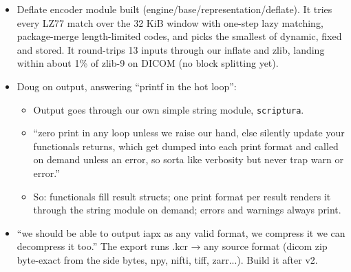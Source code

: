 \begin{itemize}
\begin{itemize}
\begin{enumerate}
\item the head (13 words) with its CRC-64;
\item the offsets and limbs with their CRC-64;
\item the deflated side bytes with a CRC-64 of the inflated bytes;
\item the member tables and names with their CRC-64;
\item EOF.
\end{enumerate}
\item engine\_\allowbreak{}iapx\_\allowbreak{}load takes an optional EngineSideBytes *side (the headers are handed back, and lane\_\allowbreak{}offset rides in it); engine\_\allowbreak{}side\_\allowbreak{}release frees it.
\item Names for the other apx files (flattened, OAPX history, BAPX bodies, IMP key) are still open with Doug. .kfc/.kst/.kgr/.ksd were offered; .ans is for the answer file.
\item The code identifiers still say iapx (engine\_\allowbreak{}iapx\_\allowbreak{}*, iapx\_\allowbreak{}path); rename them to crystal.
\end{itemize}
\item Deflate encoder module built (engine/base/representation/deflate). It tries every LZ77 match over the 32 KiB window with one-step lazy matching, package-merge length-limited codes, and picks the smallest of dynamic, fixed and stored. It round-trips 13 inputs through our inflate and zlib, landing within about 1\% of zlib-9 on DICOM (no block splitting yet).
\item Doug on output, answering “printf in the hot loop”:

\begin{itemize}
\item Output goes through our own simple string module, \texttt{scriptura}.
\item “zero print in any loop unless we raise our hand, else silently update your functionals returns, which get dumped into each print format and called on demand unless an error, so sorta like verbosity but never trap warn or error.”
\item So: functionals fill result structs; one print format per result renders it through the string module on demand; errors and warnings always print.
\end{itemize}
\item “we should be able to output iapx as any valid format, we compress it we can decompress it too.” The export runs .kcr → any source format (dicom zip byte-exact from the side bytes, npy, nifti, tiff, zarr...). Build it after v2.
\end{itemize}


